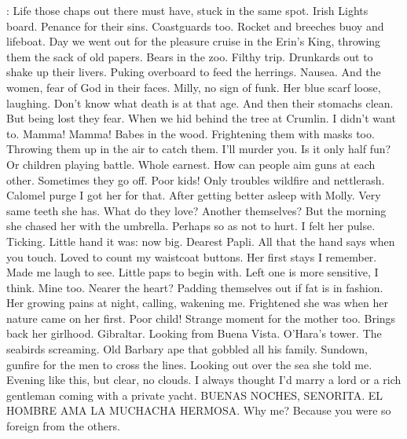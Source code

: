 \Bloom:
Life those chaps out there must have, stuck in the same spot. Irish
Lights board. Penance for their sins. Coastguards too. Rocket and breeches
buoy and lifeboat. Day we went out for the pleasure cruise in the Erin's
King, throwing them the sack of old papers. Bears in the zoo. Filthy trip.
Drunkards out to shake up their livers. Puking overboard to feed the
herrings. Nausea. And the women, fear of God in their faces. Milly,
no sign of funk. Her blue scarf loose, laughing. Don't know what death
is at that age. And then their stomachs clean. But being lost they fear.
When we hid behind the tree at Crumlin. I didn't want to. Mamma! Mamma!
Babes in the wood. Frightening them with masks too. Throwing them up
in the air to catch them. I'll murder you. Is it only half fun?
Or children playing battle. Whole earnest. How can people aim guns at
each other. Sometimes they go off. Poor kids! Only troubles wildfire
and nettlerash. Calomel purge I got her for that. After getting better
asleep with Molly. Very same teeth she has. What do they love?
Another themselves? But the morning she chased her with the umbrella.
Perhaps so as not to hurt. I felt her pulse. Ticking. Little hand
it was: now big. Dearest Papli. All that the hand says when you
touch. Loved to count my waistcoat buttons. Her first stays I
remember. Made me laugh to see. Little paps to begin with. Left one
is more sensitive, I think. Mine too. Nearer the heart? Padding
themselves out if fat is in fashion. Her growing pains at night, calling,
wakening me. Frightened she was when her nature came on her first.
Poor child! Strange moment for the mother too. Brings back her girlhood.
Gibraltar. Looking from Buena Vista. O'Hara's tower. The seabirds
screaming. Old Barbary ape that gobbled all his family. Sundown,
gunfire for the men to cross the lines. Looking out over the sea she
told me. Evening like this, but clear, no clouds. I always thought I'd
marry a lord or a rich gentleman coming with a private yacht. BUENAS
NOCHES, SENORITA. EL HOMBRE AMA LA MUCHACHA HERMOSA. Why me? Because
you were so foreign from the others.

